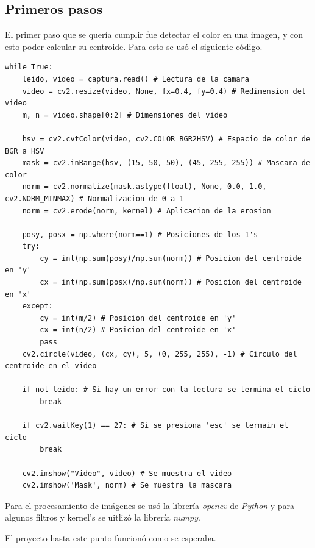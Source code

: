 \documentclass[12pt, oneside]{article}
\begin{document}
\subsection{Primeros pasos}
{\sffamily\large\justify
    \hspace{0.5cm} El primer paso que se quería cumplir fue detectar el color en una
    imagen, y con esto poder calcular su centroide. Para esto se usó el siguiente
    código.

    \lstset{style=pythonScript}
    \begin{lstlisting}
while True:
    leido, video = captura.read() # Lectura de la camara
    video = cv2.resize(video, None, fx=0.4, fy=0.4) # Redimension del video
    m, n = video.shape[0:2] # Dimensiones del video

    hsv = cv2.cvtColor(video, cv2.COLOR_BGR2HSV) # Espacio de color de BGR a HSV
    mask = cv2.inRange(hsv, (15, 50, 50), (45, 255, 255)) # Mascara de color
    norm = cv2.normalize(mask.astype(float), None, 0.0, 1.0, cv2.NORM_MINMAX) # Normalizacion de 0 a 1
    norm = cv2.erode(norm, kernel) # Aplicacion de la erosion

    posy, posx = np.where(norm==1) # Posiciones de los 1's
    try:
        cy = int(np.sum(posy)/np.sum(norm)) # Posicion del centroide en 'y'
        cx = int(np.sum(posx)/np.sum(norm)) # Posicion del centroide en 'x'
    except:
        cy = int(m/2) # Posicion del centroide en 'y'
        cx = int(n/2) # Posicion del centroide en 'x'
        pass
    cv2.circle(video, (cx, cy), 5, (0, 255, 255), -1) # Circulo del centroide en el video

    if not leido: # Si hay un error con la lectura se termina el ciclo
        break

    if cv2.waitKey(1) == 27: # Si se presiona 'esc' se termain el ciclo
        break

    cv2.imshow("Video", video) # Se muestra el video
    cv2.imshow('Mask', norm) # Se muestra la mascara
    \end{lstlisting}

    \hspace{0.5cm} Para el procesamiento de imágenes se usó la librería \emph{opencv} de
    \emph{Python} y para algunos filtros y kernel's se uitlizó la librería \emph{numpy}.

    \hspace{0.5cm} El proyecto hasta este punto funcionó como se esperaba.

}

\newpage
\end{document}
